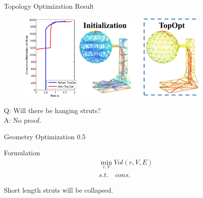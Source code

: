 \documentclass{beamer}
\begin{document}
\begin{frame}{Topology Optimization Result}
\begin{figure}
\centering
\includegraphics[height=1.7in]{./img/radii.png}
\includegraphics[height=1.7in]{./img/topopt.png}
\end{figure}
Q: Will there be hanging struts?\\
A: No proof.
\end{frame}


\begin{frame}{Geometry Optimization}
{0.5}{
\begin{block}{Formulation}
\begin{eqnarray}
\min_{r,V} Vol(r, V, E)\\
s.t.\quad cons.
\end{eqnarray}
\end{block}
Short length struts will be collapsed.
}
\end{frame}
\end{document}
